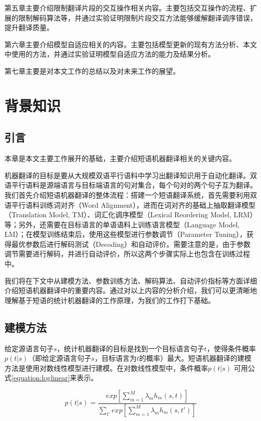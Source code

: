\documentclass[master, winfont]{njuthesis}
\begin{document}
第五章主要介绍限制翻译片段的交互操作相关内容。主要包括交互操作的流程、扩展的限制解码算法等，并通过实验证明限制片段交互方法能够缓解翻译调序错误，提升翻译质量。

第六章主要介绍模型自适应相关的内容。主要包括模型更新的现有方法分析、本文中使用的方法，并通过实验证明模型自适应方法的能力及结果分析。

第七章主要是对本文工作的总结以及对未来工作的展望。
\chapter{背景知识}
\section{引言}
本章是本文主要工作展开的基础，主要介绍短语机器翻译相关的关键内容。

机器翻译的目标是要从大规模双语平行语料中学习出翻译知识用于自动化翻译。双语平行语料是源端语言与目标端语言的句对集合，每个句对的两个句子互为翻译。我们首先介绍短语机器翻译的整体流程：搭建一个短语翻译系统，首先需要利用双语平行语料训练词对齐（Word Alignment），进而在词对齐的基础上抽取翻译模型（Translation Model, TM）、词汇化调序模型（Lexical Reordering Model, LRM）等；另外，还需要在目标语言的单语语料上训练语言模型（Language Model, LM）；在模型训练结束后，使用这些模型进行参数调节（Parameter Tuning），获得最优参数后进行解码测试（Decoding）和自动评价。需要注意的是，由于参数调节需要进行解码，并进行自动评价，所以这两个步骤实际上也包含在训练过程中。

我们将在下文中从建模方法、参数训练方法、解码算法、自动评价指标等方面详细介绍短语机器翻译中的重要内容。通过对以上内容的分析介绍，我们可以更清晰地理解基于短语的统计机器翻译的工作原理，为我们的工作打下基础。

\section{建模方法}\label{section:modeling}
给定源语言句子$s$，统计机器翻译的目标是找到一个目标语言句子$t$，使得条件概率$p(t|s)$（即给定源语言句子$s$，目标语言为$t$的概率）最大。短语机器翻译的建模方法是使用对数线性模型进行建模\cite{och2002discriminative}。在对数线性模型中，条件概率$p(t|s)$ 可用公式\ref{equation:loglinear}来表示。

\begin{equation}
  \label{equation:loglinear}
    p(t|s) = \frac{exp[\sum_{m=1}^M \lambda_mh_m(s, t)]}{\sum_{t'}exp[\sum_{m=1}^M\lambda_mh_m(s, t')]}
\end{equation}
\end{document}
